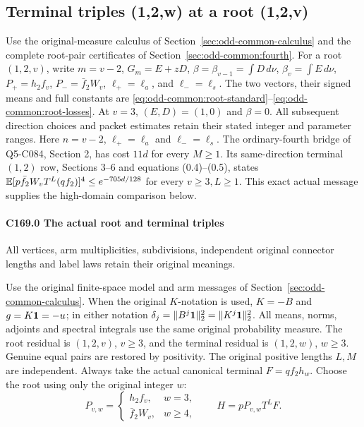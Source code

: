 \subsection{Terminal triples (1,2,w) at a root (1,2,v)}\label{proof:Q5-C169}
Use the original-measure calculus of
Section~\ref{sec:odd-common-calculus} and the complete root-pair
certificates of Section~\ref{sec:odd-common:fourth}.
For a root \((1,2,v)\), write \(m=v-2\), \(G_m=E+zD\),
\(\beta=\beta_{v-1}=\int D\,d\nu\),
\(\beta_v=\int E\,d\nu\),
\(P_+=h_2f_v\), \(P_-=\bar f_2W_v\),
\(\ell_+=\ell_a\), and \(\ell_-=\ell_s\).
The two vectors, their signed means and full constants are
\eqref{eq:odd-common:root-standard}--\eqref{eq:odd-common:root-losses}.
At \(v=3\), \((E,D)=(1,0)\) and \(\beta=0\).
All subsequent direction choices and packet estimates retain their
stated integer and parameter ranges.
Here $n=v-2$, $\ell_+=\ell_a$ and $\ell_-=\ell_s$. The ordinary-fourth bridge of Q5-C084, Section 2, has cost $11d$ for every $M\ge1$. Its same-direction terminal $(1,2)$ row, Sections 3--6 and equations (0.4)--(0.5), states $\mathbb E[p\bar f_2W_vT^L(qf_2)]^4\le e^{-705d/128}$ for every $v\ge3,L\ge1$. This exact actual message supplies the high-domain comparison below.
\paragraph{C169.0 The actual root and terminal triples}

All vertices, arm multiplicities, subdivisions, independent original connector lengths and label laws retain their original meanings.

Use the original finite-space model and arm messages of
Section~\ref{sec:odd-common-calculus}.
When the original \(K\)-notation is used, \(K=-B\) and
\(g=K\mathbf1=-u\); in either notation
\(\delta_j=\|B^j\mathbf1\|_2^2=\|K^j\mathbf1\|_2^2\).
All means, norms, adjoints and spectral integrals use the same
original probability measure.
The root residual is \((1,\allowbreak \allowbreak  2,\allowbreak \allowbreak  v)\), \(v\ge3\), and the terminal residual is \((1,\allowbreak \allowbreak  2,\allowbreak \allowbreak  w)\), \(w\ge3\). Genuine equal pairs are restored by positivity. The original positive lengths \(L,\allowbreak \allowbreak  M\) are independent. Always take the actual canonical terminal \(F=qf_2h_w\). Choose the root using only the original integer \(w\):
\[
P_{v,w}=\begin{cases}h_2f_v,&w=3,\\\bar f_2W_v,&w\ge4,\end{cases}
\qquad H=pP_{v,w}T^L F.                                      \tag{C169.0.1}
\]


